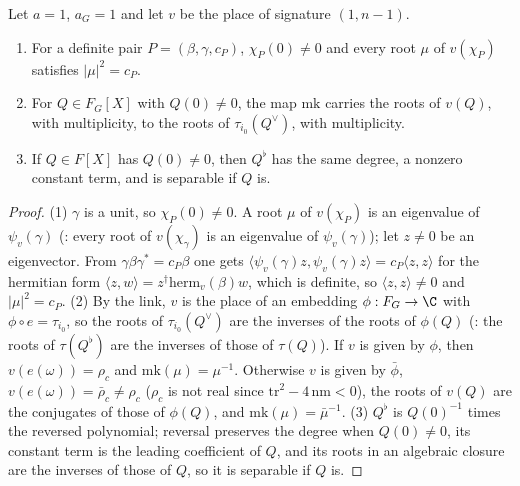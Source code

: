 \begin{lemma}\label{pf:ks1:lem-roots}
Let $a=1$, $a_G=1$ and let $v$ be the place of signature $(1,n-1)$.
\begin{enumerate}
\item For a definite pair $P=(\beta,\gamma,c_P)$, $\chi_P(0)\neq0$ and every root $\mu$ of $v(\chi_P)$ satisfies $|\mu|^2=c_P$.
\item For $Q\in F_G[X]$ with $Q(0)\neq0$, the map $\mathrm{mk}$ carries the roots of $v(Q)$, with multiplicity, to the roots of
  $\tau_{i_0}(Q^\vee)$, with multiplicity.
\item If $Q\in F[X]$ has $Q(0)\neq0$, then $Q^\flat$ has the same degree, a nonzero constant term, and is separable if $Q$ is.
\end{enumerate}
\end{lemma}

\begin{proof}
(1) $\gamma$ is a unit, so $\chi_P(0)\neq0$. A root $\mu$ of $v(\chi_P)$ is an eigenvalue of $\psi_v(\gamma)$
(: every root of $v(\chi_\gamma)$ is an eigenvalue of $\psi_v(\gamma)$); let $z\neq0$ be an eigenvector.
From $\gamma\beta\gamma^*=c_P\beta$ one gets $\langle\psi_v(\gamma)z,\psi_v(\gamma)z\rangle=c_P\langle z,z\rangle$ for the hermitian form
$\langle z,w\rangle=z^\dagger\mathrm{herm}_v(\beta)w$, which is definite, so $\langle z,z\rangle\neq0$ and $|\mu|^2=c_P$.
(2) By the link, $v$ is the place of an embedding $\phi:F_G\to\C$ with $\phi\circ e=\tau_{i_0}$, so the roots of $\tau_{i_0}(Q^\vee)$ are the inverses of the
roots of $\phi(Q)$ (: the roots of $\tau(Q^\flat)$ are the inverses of those of $\tau(Q)$). If
$v$ is given by $\phi$, then $v(e(\omega))=\rho_c$ and $\mathrm{mk}(\mu)=\mu^{-1}$. Otherwise $v$ is given by $\bar\phi$, $v(e(\omega))=\bar\rho_c\neq\rho_c$
($\rho_c$ is not real since $\mathrm{tr}^2-4\,\mathrm{nm}<0$), the roots of $v(Q)$ are the conjugates of those of $\phi(Q)$, and $\mathrm{mk}(\mu)=\bar\mu^{-1}$.
(3) $Q^\flat$ is $Q(0)^{-1}$ times the reversed polynomial; reversal preserves the degree when $Q(0)\neq0$, its constant term is the leading coefficient
of $Q$, and its roots in an algebraic closure are the inverses of those of $Q$, so it is separable if $Q$ is.
\end{proof}

